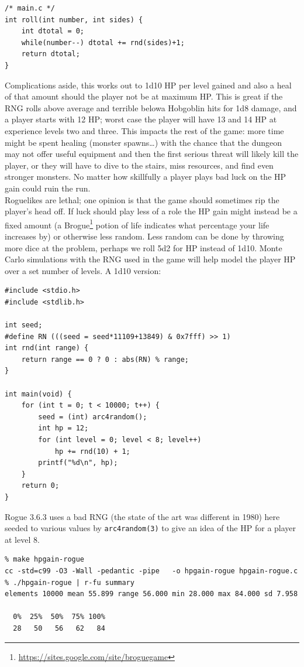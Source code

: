 \documentclass[12pt,a4paper]{article}
\begin{document}
\begin{verbatim}
/* main.c */
int roll(int number, int sides) {
    int dtotal = 0;
    while(number--) dtotal += rnd(sides)+1;
    return dtotal;
}
\end{verbatim}

Complications aside, this works out to 1d10 HP per level gained and also
a heal of that amount should the player not be at maximum HP. This is
great if the RNG rolls above average and terrible below\textendash a
Hobgoblin hits for 1d8 damage, and a player starts with 12 HP; worst
case the player will have 13 and 14 HP at experience levels two and
three. This impacts the rest of the game: more time might be spent
healing (monster spawns\ldots) with the chance that the dungeon may not
offer useful equipment and then the first serious threat will likely
kill the player, or they will have to dive to the stairs, miss
resources, and find even stronger monsters. No matter how skillfully a
player plays bad luck on the HP gain could ruin the run. \\

Roguelikes are lethal; one opinion is that the game should sometimes rip
the player's head off. If luck should play less of a role the HP gain
might instead be a fixed amount (a
Brogue\footnote{\url{https://sites.google.com/site/broguegame}} potion
of life indicates what percentage your life increases by) or otherwise
less random. Less random can be done by throwing more dice at the
problem, perhaps we roll 5d2 for HP instead of 1d10. Monte Carlo
simulations with the RNG used in the game will help model the player HP
over a set number of levels. A 1d10 version:

\begin{verbatim}
#include <stdio.h>
#include <stdlib.h>

int seed;
#define RN (((seed = seed*11109+13849) & 0x7fff) >> 1)
int rnd(int range) {
    return range == 0 ? 0 : abs(RN) % range;
}

int main(void) {
    for (int t = 0; t < 10000; t++) {
        seed = (int) arc4random();
        int hp = 12;
        for (int level = 0; level < 8; level++)
            hp += rnd(10) + 1;
        printf("%d\n", hp);
    }
    return 0;
}
\end{verbatim}

Rogue 3.6.3 uses a bad RNG (the state of the art was different in 1980)
here seeded to various values by \texttt{arc4random(3)} to give an idea
of the HP for a player at level 8.

\begin{verbatim}
% make hpgain-rogue
cc -std=c99 -O3 -Wall -pedantic -pipe   -o hpgain-rogue hpgain-rogue.c         
% ./hpgain-rogue | r-fu summary
elements 10000 mean 55.899 range 56.000 min 28.000 max 84.000 sd 7.958         

  0%  25%  50%  75% 100%
  28   50   56   62   84
\end{verbatim}
\end{document}
